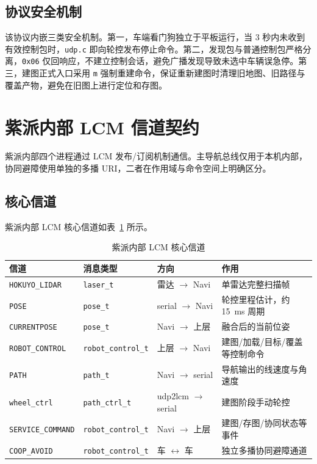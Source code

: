 \subsection{协议安全机制}
\label{sec:protocol-safety}

该协议内嵌三类安全机制。第一，车端看门狗独立于平板运行，当 3 秒内未收到有效控制包时，\texttt{udp.c} 即向轮控发布停止命令。第二，发现包与普通控制包严格分离，\texttt{0x06} 仅回响应，不建立控制会话，避免广播发现导致未选中车辆误急停。第三，建图正式入口采用 \texttt{m} 强制重建命令，保证重新建图时清理旧地图、旧路径与覆盖产物，避免在旧图上进行定位和存图。

\section{紫派内部 LCM 信道契约}
\label{sec:lcm-channels}

紫派内部四个进程通过 LCM 发布/订阅机制通信。主导航总线仅用于本机内部，协同避障使用单独的多播 URI，二者在作用域与命令空间上明确区分。

\subsection{核心信道}
\label{sec:core-channels}

紫派内部 LCM 核心信道如表~\ref{tab:lcm-channels} 所示。

\begin{table}[htbp]
\centering
\caption{紫派内部 LCM 核心信道}
\label{tab:lcm-channels}
\begin{tabularx}{\textwidth}{p{2.8cm}p{2.5cm}p{2cm}X}
\toprule
\textbf{信道} & \textbf{消息类型} & \textbf{方向} & \textbf{作用} \\
\midrule
\texttt{HOKUYO\_LIDAR} & \texttt{laser\_t} & 雷达 $\to$ Navi & 单雷达完整扫描帧 \\
\texttt{POSE} & \texttt{pose\_t} & serial $\to$ Navi & 轮控里程估计，约 15~ms 周期 \\
\texttt{CURRENTPOSE} & \texttt{pose\_t} & Navi $\to$ 上层 & 融合后的当前位姿 \\
\texttt{ROBOT\_CONTROL} & \texttt{robot\_control\_t} & 上层 $\to$ Navi & 建图/加载/目标/覆盖等控制命令 \\
\texttt{PATH} & \texttt{path\_t} & Navi $\to$ serial & 导航输出的线速度与角速度 \\
\texttt{wheel\_ctrl} & \texttt{path\_ctrl\_t} & udp2lcm $\to$ serial & 建图阶段手动轮控 \\
\texttt{SERVICE\_COMMAND} & \texttt{robot\_control\_t} & Navi $\to$ 上层 & 建图/存图/协同状态等事件 \\
\texttt{COOP\_AVOID} & \texttt{robot\_control\_t} & 车 $\leftrightarrow$ 车 & 独立多播协同避障通道 \\
\bottomrule
\end{tabularx}
\end{table}

